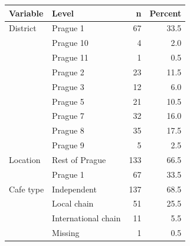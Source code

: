 \begin{tabular}{llrr}
  \toprule
Variable & Level & n & Percent \\ 
  \midrule
District & Prague 1 & 67 & 33.5 \\ 
   & Prague 10 & 4 & 2.0 \\ 
   & Prague 11 & 1 & 0.5 \\ 
   & Prague 2 & 23 & 11.5 \\ 
   & Prague 3 & 12 & 6.0 \\ 
   & Prague 5 & 21 & 10.5 \\ 
   & Prague 7 & 32 & 16.0 \\ 
   & Prague 8 & 35 & 17.5 \\ 
   & Prague 9 & 5 & 2.5 \\ 
  Location & Rest of Prague & 133 & 66.5 \\ 
   & Prague 1 & 67 & 33.5 \\ 
  Cafe type & Independent & 137 & 68.5 \\ 
   & Local chain & 51 & 25.5 \\ 
   & International chain & 11 & 5.5 \\ 
   & Missing & 1 & 0.5 \\ 
   \bottomrule
\end{tabular}
